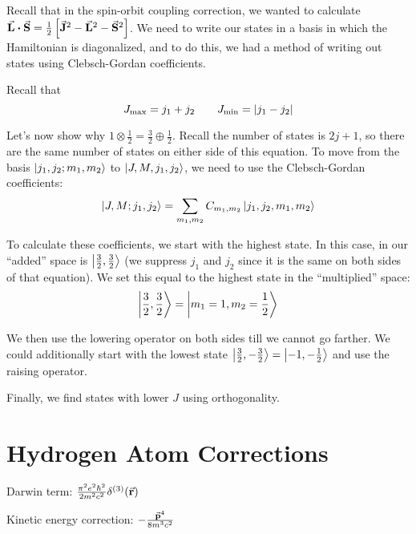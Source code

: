 \documentclass[a4paper,twoside,master.tex]{subfiles}
\begin{document}

Recall that in the spin-orbit coupling correction, we wanted to calculate $ \va{L} \vdot \va{S} = \frac{1}{2} \left[ \va{J}^2 - \va{L}^2 - \va{S}^2 \right] $. We need to write our states in a basis in which the Hamiltonian is diagonalized, and to do this, we had a method of writing out states using Clebsch-Gordan coefficients.

Recall that
\begin{equation}
    J_{\text{max}} = j_1 + j_2 \qquad J_{\text{min}} = \abs{j_1 - j_2}
\end{equation}

Let's now show why $ 1 \otimes \frac{1}{2} = \frac{3}{2} \oplus \frac{1}{2} $. Recall the number of states is $ 2j+1 $, so there are the same number of states on either side of this equation. To move from the basis $\ket{j_1, j_2; m_1, m_2} $ to $\ket{J,M, j_1, j_2} $, we need to use the Clebsch-Gordan coefficients:
\begin{equation}
    \ket{J,M; j_1, j_2} = \sum_{m_1, m_2} C_{m_1, m_2}\ket{j_1, j_2, m_1, m_2}
\end{equation}

To calculate these coefficients, we start with the highest state. In this case, in our ``added'' space is $\ket{\frac{3}{2}, \frac{3}{2}} $ (we suppress $ j_1 $ and $ j_2 $ since it is the same on both sides of that equation). We set this equal to the highest state in the ``multiplied'' space:
\begin{equation}
    \ket{\frac{3}{2}, \frac{3}{2}} =\ket{m_1=1, m_2=\frac{1}{2}}
\end{equation}

We then use the lowering operator on both sides till we cannot go farther. We could additionally start with the lowest state $\ket{\frac{3}{2}, - \frac{3}{2}} =\ket{-1, - \frac{1}{2}} $ and use the raising operator.

Finally, we find states with lower $ J $ using orthogonality.

\section{Hydrogen Atom Corrections}
\label{sec:hydrogen_atom_corrections}

Darwin term: $ \frac{\pi^2 e^2 \hbar^2}{2 m^2 c^2} \delta^{(3)}(\va{r}) $

Kinetic energy correction: $ - \frac{\va{p}^4}{8 m^3 c^2} $
\end{document}
